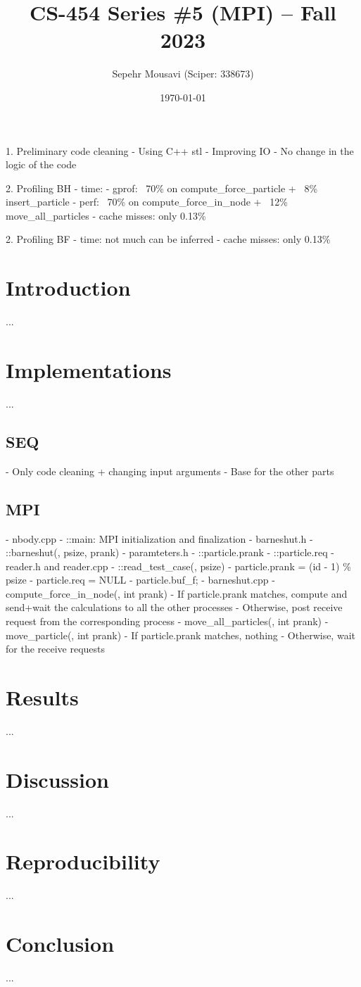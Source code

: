 \documentclass[10pt,journal,compsocconf]{IEEEtran}
\title{CS-454 Series \#5 (MPI) -- Fall 2023}
\author{
  Sepehr Mousavi (Sciper: 338673)
}
\date{\today}
\begin{document}
\maketitle


1. Preliminary code cleaning
  - Using C++ stl
  - Improving IO
  - No change in the logic of the code

2. Profiling BH
  - time:
    - gprof: ~70\% on compute_force_particle + ~8\% insert_particle
    - perf: ~70\% on compute_force_in_node + ~12\% move_all_particles
  - cache misses: only 0.13\%
    
2. Profiling BF
  - time: not much can be inferred
  - cache misses: only 0.13\%


\section{Introduction}
...

\section{Implementations}
...

\subsection{SEQ}
- Only code cleaning + changing input arguments
- Base for the other parts

\subsection{MPI}
- nbody.cpp
  - ::main: MPI initialization and finalization
- barneshut.h
  - ::barneshut(, psize, prank)
- paramteters.h
  - ::particle.prank
  - ::particle.req
- reader.h and reader.cpp
  - ::read_test_case(, psize)
  - particle.prank = (id - 1) \% psize
  - particle.req = NULL
  - particle.buf_f;
- barneshut.cpp
  - compute_force_in_node(, int prank)
    - If particle.prank matches, compute and send+wait the calculations to all the other processes
    - Otherwise, post receive request from the corresponding process
  - move_all_particles(, int prank)
  - move_particle(, int prank)
      - If particle.prank matches, nothing
      - Otherwise, wait for the receive requests

\section{Results}
...

\section{Discussion}
...

\section{Reproducibility}
...

\section{Conclusion}
...
\end{document}
